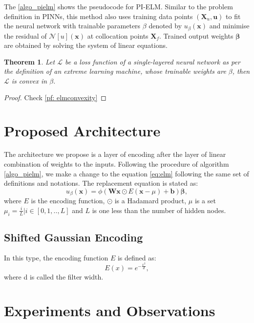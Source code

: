 \documentclass{article}
\newtheorem{theorem}{Theorem}[section]
\begin{document}
The \cref{algo_pielm} shows the pseudocode for PI-ELM. Similar to the problem definition in PINNs, this method also uses training data points $(\mathbf{X}_u, \mathbf{u})$ to fit the neural network with trainable parameters $\beta$ denoted by $u_\beta(\mathbf{x})$ and minimise the residual of $\mathcal{N}[u](\mathbf{x})$ at collocation points $\mathbf{X}_f$. Trained output weights $\mathbf{\beta}$ are obtained by solving the system of linear equations.

\begin{theorem}
\label{th: elmconvexity}
Let \(\mathcal{L}\) be a loss function of a single-layered neural network as per the definition of an extreme learning machine, whose trainable weights are \(\beta\), then \(\mathcal{L}\) is convex in \(\beta\).
\end{theorem}

\begin{proof}
Check \cref{pf: elmconvexity}
\end{proof}

\section{Proposed Architecture}
The architecture we propose is a layer of encoding after the layer of linear combination of weights to the inputs. Following the procedure of algorithm \cref{algo_pielm}, we make a change to the equation \cref{eq:elm} following the same set of definitions and notations. The replacement equation is stated as:
\begin{equation}
\label{encoded_ELM}
u_\beta(\mathbf{x}) = \phi(\mathbf{W} \mathbf{x} \odot E(\mathbf{x} - \mu) + \mathbf{b}) \mathbf{\beta},
\end{equation}
where $E$ is the encoding function, $\odot$ is a Hadamard product, $\mu$ is a set {$\mu_i = \frac{i}{L} | i \in [0, 1,..,L]$} and $L$ is one less than the number of hidden nodes.

\subsection{Shifted Gaussian Encoding} 
In this type, the encoding function $E$ is defined as:
\begin{equation}
E(x) = e^{-\frac{x^2}{d}},    
\end{equation}
where d is called the filter width.


\section{Experiments and Observations}
\label{expts}
\end{document}
